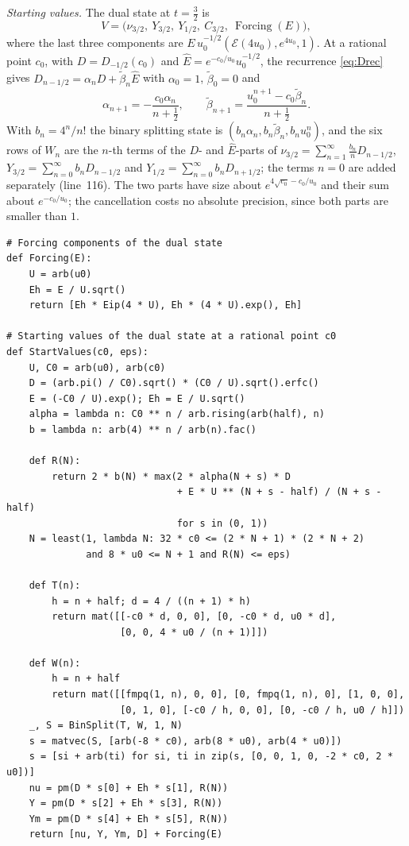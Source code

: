 \documentclass[11pt,reqno]{amsart}
\theoremstyle{definition}
\theoremstyle{remark}
\newcommand{\Eip}{\mathcal{E}}
\begin{document}
\emph{Starting values.} The dual state at $t = \frac32$ is
\[
  V = \bigl(\nu_{3/2},\ Y_{3/2},\ Y_{1/2},\ C_{3/2},\ \operatorname{Forcing}(E)\bigr),
\]
where the last three components are $E\,u_0^{-1/2}(\Eip(4u_0), e^{4u_0}, 1)$. At a rational point $c_0$, with $D = D_{-1/2}(c_0)$ and
$\hat E = e^{-c_0/u_0}u_0^{-1/2}$, the recurrence \eqref{eq:Drec} gives $D_{n-1/2} = \alpha_nD + \tilde\beta_n\hat E$
with $\alpha_0 = 1$, $\tilde\beta_0 = 0$ and
\[
  \alpha_{n+1} = -\frac{c_0\alpha_n}{n+\frac12}, \qquad \tilde\beta_{n+1} = \frac{u_0^{n+1} - c_0\tilde\beta_n}{n+\frac12}.
\]
With $b_n = 4^n/n!$ the binary splitting state is $(b_n\alpha_n, b_n\tilde\beta_n, b_nu_0^n)$, and the six rows of
$W_n$ are the $n$-th terms of the $D$- and $\hat E$-parts of $\nu_{3/2} = \sum_{n=1}^{\infty}\frac{b_n}nD_{n-1/2}$,
$Y_{3/2} = \sum_{n=0}^{\infty}b_nD_{n-1/2}$ and $Y_{1/2} = \sum_{n=0}^{\infty}b_nD_{n+1/2}$; the terms $n = 0$ are added
separately (line~116). The two parts have size about $e^{4\sqrt{c_0} - c_0/u_0}$ and their sum about $e^{-c_0/u_0}$;
the cancellation costs no absolute precision, since both parts are smaller than $1$.
\begin{lstlisting}[style=ref, firstnumber=84]
# Forcing components of the dual state
def Forcing(E):
    U = arb(u0)
    Eh = E / U.sqrt()
    return [Eh * Eip(4 * U), Eh * (4 * U).exp(), Eh]

# Starting values of the dual state at a rational point c0
def StartValues(c0, eps):
    U, C0 = arb(u0), arb(c0)
    D = (arb.pi() / C0).sqrt() * (C0 / U).sqrt().erfc()
    E = (-C0 / U).exp(); Eh = E / U.sqrt()
    alpha = lambda n: C0 ** n / arb.rising(arb(half), n)
    b = lambda n: arb(4) ** n / arb(n).fac()

    def R(N):
        return 2 * b(N) * max(2 * alpha(N + s) * D
                              + E * U ** (N + s - half) / (N + s - half)
                              for s in (0, 1))
    N = least(1, lambda N: 32 * c0 <= (2 * N + 1) * (2 * N + 2)
              and 8 * u0 <= N + 1 and R(N) <= eps)

    def T(n):
        h = n + half; d = 4 / ((n + 1) * h)
        return mat([[-c0 * d, 0, 0], [0, -c0 * d, u0 * d],
                    [0, 0, 4 * u0 / (n + 1)]])

    def W(n):
        h = n + half
        return mat([[fmpq(1, n), 0, 0], [0, fmpq(1, n), 0], [1, 0, 0],
                    [0, 1, 0], [-c0 / h, 0, 0], [0, -c0 / h, u0 / h]])
    _, S = BinSplit(T, W, 1, N)
    s = matvec(S, [arb(-8 * c0), arb(8 * u0), arb(4 * u0)])
    s = [si + arb(ti) for si, ti in zip(s, [0, 0, 1, 0, -2 * c0, 2 * u0])]
    nu = pm(D * s[0] + Eh * s[1], R(N))
    Y = pm(D * s[2] + Eh * s[3], R(N))
    Ym = pm(D * s[4] + Eh * s[5], R(N))
    return [nu, Y, Ym, D] + Forcing(E)
\end{lstlisting}
\end{document}
